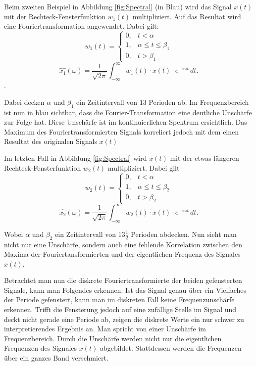 Beim zweiten Beispiel in Abbildung \ref{fig:Spectral} (in Blau) wird das Signal $x(t)$ mit der Rechteck-Fensterfunktion $w_{1}(t)$ multipliziert. Auf das Resultat wird eine Fouriertransformation angewendet. Dabei gilt: 
\begin{equation}
	w_{1}(t)=  \left\{\begin{array}{lll}{0,} & {t<\alpha}  \\ {1,}&{\alpha\leq t \leq\beta_{1}} \\ {0,} &{t>\beta_{1}}\end{array} \right.
\end{equation}
\begin{equation}
	\hat{x_{1}}(\omega)=\frac{1}{\sqrt{2 \pi}} \int_{-\infty}^{\infty} w_{1}(t)\cdot x(t) \cdot e^{-i \omega t} \,dt.
\end{equation}.

Dabei decken $\alpha$ und $\beta_{1}$ ein Zeitintervall von $13$ Perioden ab. Im Frequenzbereich ist nun in blau sichtbar, dass die Fourier-Transformation eine deutliche Unschärfe zur Folge hat. Diese Unschärfe ist im kontinuierlichen Spektrum ersichtlich. Das Maximum des Fouriertransformierten Signals korreliert jedoch mit dem einen Resultat des originalen Signals $x(t)$




Im letzten Fall in Abbildung \ref{fig:Spectral} wird $x(t)$ mit der etwas längeren Rechteck-Fensterfunktion $w_{2}(t)$ multipliziert. Dabei gilt 
\begin{equation}
	w_{2}(t)= \left\{ \begin{array}{lll}{0,}&{t<\alpha}  \\ {1,}&{\alpha\leq t \leq\beta_{2}} \\ {0,}&{t>\beta_{2}}\end{array} \right.
\end{equation}
\begin{equation}
	\hat{x_{2}}(\omega)=\frac{1}{\sqrt{2 \pi}} \int_{-\infty}^{\infty} w_{2}(t)\cdot x(t) \cdot e^{-i \omega t} \,dt.
\end{equation}

Wobei $\alpha$ und $\beta_{2}$ ein Zeitintervall von $13\frac{1}{2}$ Perioden abdecken. Nun sieht man nicht nur eine Unschärfe, sondern auch eine fehlende Korrelation zwischen den Maxima der Fouriertansformierten und der eigentlichen Frequenz des Signales $x(t)$.

Betrachtet man nun die diskrete Fouriertransformierte der beiden gefensterten Signale, kann man Folgendes erkennen: Ist das Signal genau über ein Vielfaches der Periode gefenstert, kann man im diskreten Fall keine Frequenzunschärfe erkennen. Trifft die Fensterung jedoch auf eine zufällige Stelle im Signal und deckt nicht gerade eine Periode ab, zeigen die diskrete Werte ein nur schwer zu interpretierendes Ergebnis an. Man spricht von einer Unschärfe im Frequenzbereich. Durch die Unschärfe werden nicht nur die eigentlichen Frequenzen des Signales $x(t)$ abgebildet. Stattdessen werden die Frequenzen über ein ganzes Band verschmiert.

